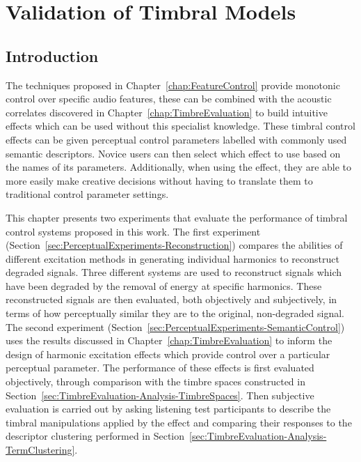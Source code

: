 \chapter{Validation of Timbral Models}
\label{chap:PerceptualExperiments}

\section{Introduction}
\label{sec:PerceptualExperiments-Introduction}
	The techniques proposed in Chapter~\ref{chap:FeatureControl} provide monotonic control over specific audio
	features, these can be combined with the acoustic correlates discovered in Chapter~\ref{chap:TimbreEvaluation} to
	build intuitive effects which can be used without this specialist knowledge. These timbral control effects can be
	given perceptual control parameters labelled with commonly used semantic descriptors. Novice users can then select
	which effect to use based on the names of its parameters. Additionally, when using the effect, they are able to
	more easily make creative decisions without having to translate them to traditional control parameter settings.

	This chapter presents two experiments that evaluate the performance of timbral control systems proposed in this
	work. The first experiment (Section~\ref{sec:PerceptualExperiments-Reconstruction}) compares the abilities of
	different excitation methods in generating individual harmonics to reconstruct degraded signals. Three different
	systems are used to reconstruct signals which have been degraded by the removal of energy at specific harmonics.
	These reconstructed signals are then evaluated, both objectively and subjectively, in terms of how perceptually
	similar they are to the original, non-degraded signal. The second experiment
	(Section~\ref{sec:PerceptualExperiments-SemanticControl}) uses the results discussed in
	Chapter~\ref{chap:TimbreEvaluation} to inform the design of harmonic excitation effects which provide control over
	a particular perceptual parameter. The performance of these effects is first evaluated objectively, through
	comparison with the timbre spaces constructed in Section~\ref{sec:TimbreEvaluation-Analysis-TimbreSpaces}. Then
	subjective evaluation is carried out by asking listening test participants to describe the timbral manipulations
	applied by the effect and comparing their responses to the descriptor clustering performed in
	Section~\ref{sec:TimbreEvaluation-Analysis-TermClustering}.

